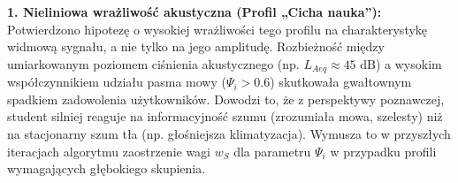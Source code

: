 \documentclass[14pt,a4paper]{extarticle}
\begin{document}
\begin{table}[H]
    \centering
    \caption{Podsumowanie zadowolenia po wizycie w sali rekomendowanej przez aplikację.}
    \label{tab:zadowolenie}
\end{table}

\begin{table}[H]
    \centering
    \caption{Przyczyny zgłoszonego niezadowolenia (wielokrotny wybór; $N_{niezadow.} = 7$).}
    \label{tab:przyczyny}
\end{table}

\textbf{1. Nieliniowa wrażliwość akustyczna (Profil „Cicha nauka”):}
Potwierdzono hipotezę o wysokiej wrażliwości tego profilu na charakterystykę widmową sygnału, a nie tylko na jego amplitudę. Rozbieżność między umiarkowanym poziomem ciśnienia akustycznego (np. $L_{Aeq} \approx 45\text{ dB}$) a wysokim współczynnikiem udziału pasma mowy ($\Psi_i > 0.6$) skutkowała gwałtownym spadkiem zadowolenia użytkowników. Dowodzi to, że z perspektywy poznawczej, student silniej reaguje na informacyjność szumu (zrozumiała mowa, szelesty) niż na stacjonarny szum tła (np. głośniejsza klimatyzacja). Wymusza to w przyszłych iteracjach algorytmu zaostrzenie wagi $w_S$ dla parametru $\Psi_i$ w przypadku profili wymagających głębokiego skupienia.
\end{document}
